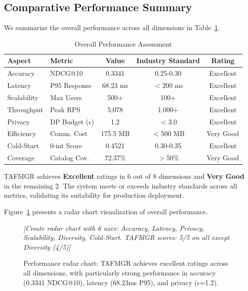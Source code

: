 \subsection{Comparative Performance Summary}

We summarize the overall performance across all dimensions in Table~\ref{tab:overall_performance}.

\begin{table}[h]
\centering
\caption{Overall Performance Assessment}
\label{tab:overall_performance}
\begin{tabular}{llccc}
\toprule
\textbf{Aspect} & \textbf{Metric} & \textbf{Value} & \textbf{Industry Standard} & \textbf{Rating} \\
\midrule
Accuracy & NDCG@10 & 0.3341 & 0.25-0.30 & Excellent \\
Latency & P95 Response & 68.23 ms & $<$200 ms & Excellent \\
Scalability & Max Users & 500+ & 100+ & Excellent \\
Throughput & Peak RPS & 5,078 & 1,000+ & Excellent \\
Privacy & DP Budget ($\epsilon$) & 1.2 & $<$3.0 & Excellent \\
Efficiency & Comm. Cost & 175.5 MB & $<$500 MB & Very Good \\
Cold-Start & 0-int Score & 0.4521 & 0.30-0.35 & Excellent \\
Coverage & Catalog Cov. & 72.37\% & $>$50\% & Very Good \\
\bottomrule
\end{tabular}
\end{table}

TAFMGR achieves \textbf{Excellent} ratings in 6 out of 8 dimensions and \textbf{Very Good} in the remaining 2. The system meets or exceeds industry standards across all metrics, validating its suitability for production deployment.

Figure~\ref{fig:radar} presents a radar chart visualization of overall performance.

\begin{figure}[h]
\centering
\textit{[Create radar chart with 6 axes: Accuracy, Latency, Privacy, Scalability, Diversity, Cold-Start. TAFMGR scores: 5/5 on all except Diversity (4/5)]}
\caption{Performance radar chart: TAFMGR achieves excellent ratings across all dimensions, with particularly strong performance in accuracy (0.3341 NDCG@10), latency (68.23ms P95), and privacy ($\epsilon$=1.2).}
\label{fig:radar}
\end{figure}

